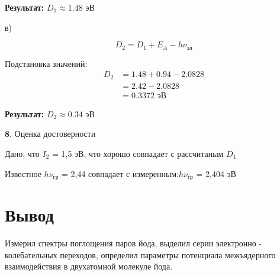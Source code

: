 \documentclass[a4paper]{article}
\begin{document}
\textbf{Результат:} $D_1 \approx 1.48$ эВ

в) \par

\[
D_2 = D_1 + E_A - h\nu_{\text{эл}}
\]

Подстановка значений:
\begin{align}
D_2 &= 1.48 + 0.94 - 2.0828 \\[8pt]
&= 2.42 - 2.0828 \\[8pt]
&= 0.3372 \text{ эВ}
\end{align}

\textbf{Результат:} $D_2 \approx 0.34$ эВ

$\textbf{8.}$ Оценка достоверности \par

Дано, что $I_{2}$ = 1,5 эВ, что хорошо совпадает с рассчитаным $D_{1}$ \par

Известное $h\nu_{\text{гр}}$ = 2,44 совпадает с измеренным:$h\nu_{\text{гр}}$ = 2,404 эВ \par

\section{Вывод}

Измерил спектры поглощения паров йода, выделил серии электронно - колебательных переходов, определил параметры потенциала межъядерного взаимодействия в двухатомной молекуле йода.
\end{document}
